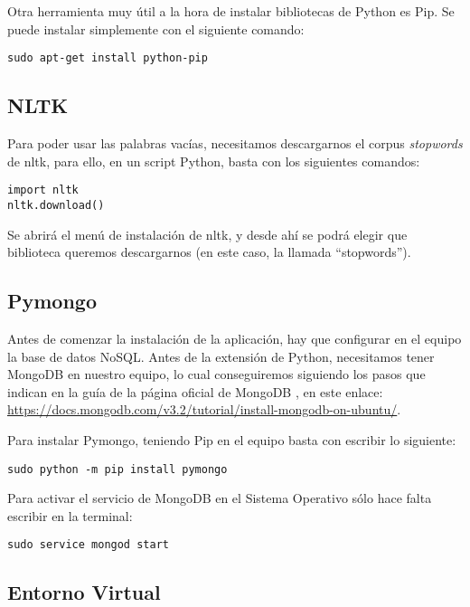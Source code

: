 Otra herramienta muy útil a la hora de instalar bibliotecas de Python es Pip. Se puede instalar simplemente con el siguiente comando: 

\begin{verbatim}
sudo apt-get install python-pip
\end{verbatim}

\subsection{NLTK}

Para poder usar las palabras vacías, necesitamos descargarnos el corpus \emph{stopwords} de nltk, para ello, en un script Python, basta con los siguientes comandos:

\begin{verbatim}
import nltk
nltk.download()
\end{verbatim}

Se abrirá el menú de instalación de nltk, y desde ahí se podrá elegir que biblioteca queremos descargarnos (en este caso, la llamada ``stopwords'').

\subsection{Pymongo}

Antes de comenzar la instalación de la aplicación, hay que configurar en el equipo la base de datos NoSQL. Antes de la extensión de Python, necesitamos tener MongoDB en nuestro equipo, lo cual conseguiremos siguiendo los pasos que indican en la guía de la página oficial de MongoDB \cite{Chodorow:2010:MDG:1941134}, en este enlace: \url{https://docs.mongodb.com/v3.2/tutorial/install-mongodb-on-ubuntu/}.

Para instalar Pymongo, teniendo Pip en el equipo basta con escribir lo siguiente:

\begin{verbatim}
sudo python -m pip install pymongo
\end{verbatim}


Para activar el servicio de MongoDB en el Sistema Operativo sólo hace falta escribir en la terminal:

\begin{verbatim}
sudo service mongod start
\end{verbatim}

\subsection{Entorno Virtual}

